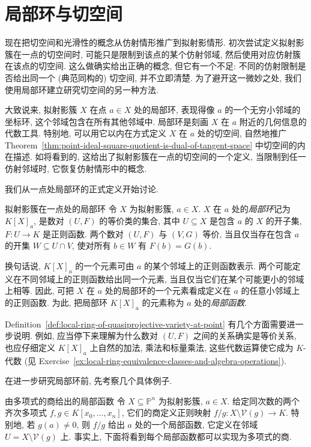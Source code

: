 \section{局部环与切空间}\label{sec:local-rings-and-tangent-spaces}

现在把切空间和光滑性的概念从仿射情形推广到拟射影情形. 初次尝试定义拟射影簇在一点的切空间时, 可能只是限制到该点的某个仿射邻域, 然后使用对应仿射簇在该点的切空间. 这么做确实给出正确的概念, 但它有一个不足: 不同的仿射限制是否给出同一个 (典范同构的) 切空间, 并不立即清楚. 为了避开这一微妙之处, 我们使用局部环建立研究切空间的另一种方法.

大致说来, 拟射影簇 $X$ 在点 $a\in X$ 处的局部环, 表现得像 $a$ 的一个无穷小邻域的坐标环, 这个邻域包含在所有其他邻域中. 局部环是刻画 $X$ 在 $a$ 附近的几何信息的代数工具. 特别地, 可以用它以内在方式定义 $X$ 在 $a$ 处的切空间, 自然地推广 Theorem~\ref{thm:point-ideal-square-quotient-is-dual-of-tangent-space} 中切空间的内在描述. 如将看到的, 这给出了拟射影簇在一点的切空间的一个定义, 当限制到任一仿射邻域时, 它恢复仿射情形中的概念.

我们从一点处局部环的正式定义开始讨论.

\begin{Definition}{拟射影簇在一点处的局部环}\leavevmode\label{def:local-ring-of-quasiprojective-variety-at-point}
令 $X$ 为拟射影簇, $a\in X$. $X$ 在 $a$ 处的\emph{局部环}记为 $K[X]_{a}$, 是数对 $(U,F)$ 的等价类的集合, 其中 $U\subseteq X$ 是包含 $a$ 的 $X$ 的开子集, $F:U\to K$ 是正则函数. 两个数对 $(U,F)$ 与 $(V,G)$ 等价, 当且仅当存在包含 $a$ 的开集 $W\subseteq U\cap V$, 使对所有 $b\in W$ 有 $F(b)=G(b)$.
\end{Definition}

换句话说, $K[X]_{a}$ 的一个元素可由 $a$ 的某个邻域上的正则函数表示. 两个可能定义在不同邻域上的正则函数给出同一个元素, 当且仅当它们在某个可能更小的邻域上相等. 因此, 可把 $X$ 在 $a$ 处的局部环的一个元素看成定义在 $a$ 的任意小邻域上的正则函数. 为此, 把局部环 $K[X]_{a}$ 的元素称为 $a$ 处的\emph{局部函数}.

Definition~\ref{def:local-ring-of-quasiprojective-variety-at-point} 有几个方面需要进一步说明. 例如, 应当停下来理解为什么数对 $(U,F)$ 之间的关系确实是等价关系, 也应仔细定义 $K[X]_{a}$ 上自然的加法, 乘法和标量乘法, 这些代数运算使它成为 $K$-代数 (见 Exercise~\ref{ex:local-ring-equivalence-classes-and-algebra-operations}).

在进一步研究局部环前, 先考察几个具体例子.

\begin{Example}{由多项式的商给出的局部函数}\leavevmode\label{ex:local-functions-from-homogeneous-quotients}
令 $X\subseteq\mathbb{P}^{n}$ 为拟射影簇, $a\in X$. 给定同次数的两个齐次多项式 $f,g\in K[x_{0},\ldots,x_{n}]$, 它们的商定义正则映射 $f/g:X\setminus\mathcal{V}(g)\to K$. 特别地, 若 $g(a)\ne0$, 则 $f/g$ 给出 $a$ 处的一个局部函数, 它定义在邻域 $U=X\setminus\mathcal{V}(g)$ 上. 事实上, 下面将看到每个局部函数都可以实现为多项式的商.
\end{Example}

